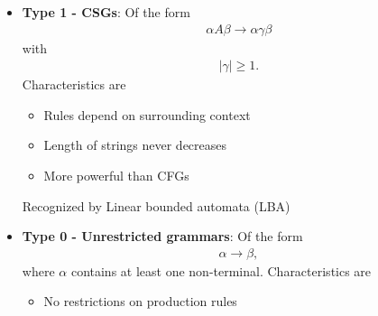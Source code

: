 \documentclass{report}
\begin{document}
\begin{itemize}
\begin{itemize}
                    \begin{itemize}
                        \item Allows recursion
                        \item Can represent nested structures
                        \item Most programming language syntax is CFG-based
                    \end{itemize}
                    Recognized by push down automata (PDA). Examples are
                    \begin{itemize}
                        \item Arithmetic expressions
                        \item Balanced parentheses
                        \item Programming language syntax
                    \end{itemize}
                \item \textbf{Type 1 - CSGs}: Of the form
                    \begin{align*}
                        \alpha A \beta \to \alpha \gamma \beta
                    \end{align*}
                    with 
                    \begin{align*}
                        \left\lvert \gamma \right\rvert \geq 1
                    .\end{align*}
                    Characteristics are
                    \begin{itemize}
                        \item Rules depend on surrounding context
                        \item Length of strings never decreases
                        \item More powerful than CFGs
                    \end{itemize}
                    Recognized by Linear bounded automata (LBA)
                \item \textbf{Type 0 - Unrestricted grammars}: Of the form
                    \begin{align*}
                        \alpha \to \beta
                    ,\end{align*}
                    where $\alpha$ contains at least one non-terminal. Characteristics are
                    \begin{itemize}
                        \item No restrictions on production rules

\end{itemize}
\end{itemize}
\end{itemize}
\end{document}
